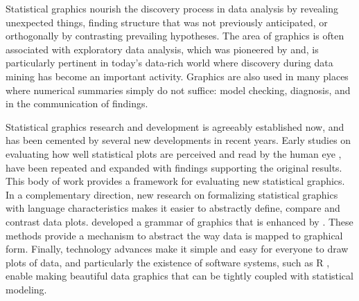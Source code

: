 \documentclass[12pt]{article}
\begin{document}
Statistical graphics nourish the discovery process in data analysis by revealing unexpected things,  finding structure that was not previously anticipated,  or orthogonally by contrasting prevailing hypotheses. The area of graphics is often associated with exploratory data analysis, which was pioneered by \cite{tukey:eda} and, is particularly pertinent in today's data-rich world where discovery during data mining has become an important activity. Graphics are also used in many places where numerical summaries simply do not suffice: model checking, diagnosis, and in the communication of findings. 

Statistical graphics research and development is agreeably established now, and has been cemented by several new developments in recent years. Early studies on evaluating how well statistical plots are perceived and read by the human eye \citep{cleveland:1984}, have been repeated and expanded \citep{simkin:1987,spence:1991, heer:2010} with findings supporting the original results. This body of work provides a framework for evaluating new statistical graphics.  In a complementary direction, new research on formalizing statistical graphics with language characteristics makes it easier to abstractly define, compare and contrast data plots. \cite{wilkinson:1999} developed a grammar of graphics that is enhanced by \cite{hadley:2009}. These methods provide a mechanism to abstract the way data is mapped to graphical form. Finally, technology advances make it simple and easy for everyone to draw plots of data, and particularly the existence of software systems, such as R \citep{R}, enable making beautiful data graphics that can be tightly coupled with statistical modeling.
\end{document}
